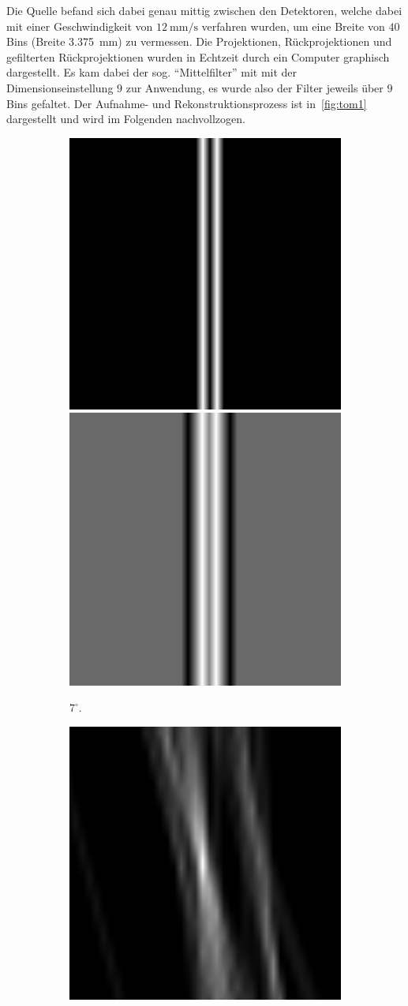\documentclass[slug=PET, room=Andreas-Schubert-Bau\,\ 424A,
supervisor=Carsten\ Bittrich, coursedate=10.\ 01.\ 2020, ngerman]{../../Lab_Report_LaTeX/lab_report}
\begin{document}
Die Quelle befand sich dabei genau mittig zwischen den Detektoren,
welche dabei mit einer Geschwindigkeit von
\(\SI{12}{\milli\metre\per\second}\) verfahren wurden, um eine Breite
von \(40\) Bins (Breite \SI{3.375}{\milli\meter}) zu vermessen. Die
Projektionen, R\"uckprojektionen und gefilterten R\"uckprojektionen
wurden in Echtzeit durch ein Computer graphisch dargestellt. Es kam
dabei der sog. ``Mittelfilter'' mit mit der Dimensionseinstellung
\(9\) zur Anwendung, es wurde also der Filter jeweils \"uber \(9\)
Bins gefaltet. Der Aufnahme- und Rekonstruktionsprozess ist
in~\ref{fig:tom1} dargestellt und wird im Folgenden nachvollzogen.

\begin{figure}[htp]
  \begin{subfigure}{0.5\textwidth}
    \centering
    \includegraphics[width=.4\textwidth]{../messungen/oliTOM1/1_einfach.png}
    \includegraphics[width=.4\textwidth]{../messungen/oliTOM1/1_gefiltert.png}
    \caption{\(7^\circ\).}
    \label{eq:tom1-7}
  \end{subfigure}
  \begin{subfigure}{0.5\textwidth}
    \centering
    \includegraphics[width=.4\textwidth]{../messungen/oliTOM1/3_einfach.png}

\end{subfigure}
\end{figure}
\end{document}
